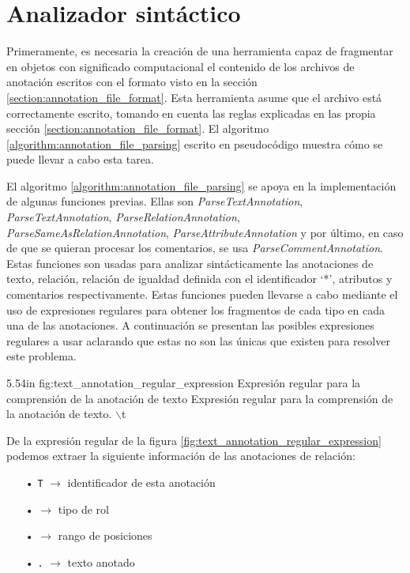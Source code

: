 \section{Analizador sintáctico}
Primeramente, es necesaria la creación de una herramienta capaz de fragmentar en objetos con significado computacional el contenido de los archivos de anotación escritos con el formato visto en la sección \ref{section:annotation_file_format}. Esta herramienta asume que el archivo está correctamente escrito, tomando en cuenta las reglas explicadas en las propia sección \ref{section:annotation_file_format}. El algoritmo \ref{algorithm:annotation_file_parsing} escrito en pseudocódigo muestra cómo se puede llevar a cabo esta tarea.

El algoritmo \ref{algorithm:annotation_file_parsing} se apoya en la implementación de algunas funciones previas. Ellas son \textit{ParseTextAnnotation}, \textit{ParseTextAnnotation}, \textit{ParseRelationAnnotation}, \textit{ParseSameAsRelationAnnotation}, \textit{ParseAttributeAnnotation} y por último, en caso de que se quieran procesar los comentarios, se usa \textit{ParseCommentAnnotation}. Estas funciones son usadas para analizar sintácticamente las anotaciones de texto, relación, relación de igualdad definida con el identificador `*', atributos y comentarios respectivamente. Estas funciones pueden llevarse a cabo mediante el uso de expresiones regulares para obtener los fragmentos de cada tipo en cada una de las anotaciones. A continuación se presentan las posibles expresiones regulares a usar aclarando que estas no son las únicas que existen para resolver este problema.

\begin{annexample}
[backgroundcolor=white]
{5.54in}
{fig:text_annotation_regular_expression}
{Expresión regular para la comprensión de la anotación de texto}
{Expresión regular para la comprensión de la anotación de texto.}
	\ttfamily
	\StartingRegex{}$\backslash$t\,  \EndingRegex
\end{annexample}

De la expresión regular de la figura \ref{fig:text_annotation_regular_expression} podemos extraer la siguiente información de las anotaciones de relación:
\begin{itemize}
	\item[•] \texttt{T\OneOrMoreRegex} $\longrightarrow$ identificador de esta anotación
	\item[•] \texttt{\OneOrMoreRegex} $\longrightarrow$ tipo de rol
	\item[•] \texttt{\OneOrMoreRegex\space{}\OneOrMoreRegex{}\ZeroOrMoreRegex} $\longrightarrow$ rango de posiciones
	\item[•] \texttt{.\OneOrMoreRegex} $\longrightarrow$ texto anotado
\end{itemize}


